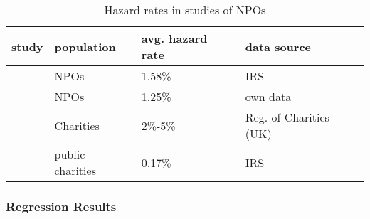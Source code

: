 \documentclass[12pt]{article}
\begin{document}
\begin{table}[htbp]
\caption{\label{tbl:litreview2}Hazard rates in studies of NPOs}
\centering
\begin{tabular}{llll}
\hline
study & population & avg. hazard rate & data source\\
\hline
\cite{Gordon_etal_2013_insolvency} & NPOs & 1.58\% & IRS\\
\cite{Hager_Galaskiewicz_Larson_2007_liability} & NPOs & 1.25\% & own data\\
\cite{Clifford_2018_reinforcing} & Charities & 2\%-5\% & Reg. of Charities (UK)\\
\cite{Mayer_2022_slimmer} & public charities & 0.17\% & IRS\\
\hline
\end{tabular}
\end{table}





\subsubsection*{Regression Results}
\end{document}
